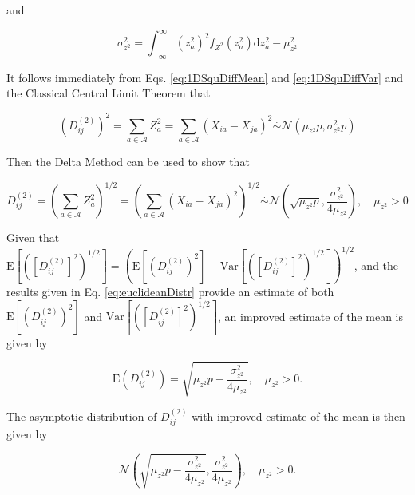 \documentclass[10pt,letterpaper]{article}\usepackage[]{graphicx}\usepackage[]{color}
\begin{document}
and

\begin{equation}\label{eq:1DSquDiffVar}
\sigma^2_{z^2} = \int_{-\infty}^{\infty} (z^2_a)^2 f_{Z^2}(z^2_a) \text{d}z^2_a - \mu^2_{z^2}
\end{equation}

It follows immediately from Eqs. \ref{eq:1DSquDiffMean} and \ref{eq:1DSquDiffVar} and the Classical Central Limit Theorem that

\begin{equation}\label{eq:SquDiffDistrGeneral}
\left(D^{(2)}_{ij}\right)^2 = \sum_{a \in \mathcal{A}} Z^2_a = \sum_{a \in \mathcal{A}} (X_{ia} - X_{ja})^2 \overset{.}{\sim} \mathcal{N}\left(\mu_{z^2}p,\sigma^2_{z^2}p\right)
\end{equation}

Then the Delta Method \cite{allStats} can be used to show that

\begin{equation}\label{eq:euclideanDistr}
D^{(2)}_{ij} = \left(\sum_{a \in \mathcal{A}} Z^2_a\right)^{1/2} = \left(\sum_{a \in \mathcal{A}} (X_{ia} - X_{ja})^2\right)^{1/2} \overset{.}{\sim} \mathcal{N}\left(\sqrt{\mu_{z^2}p},\frac{\sigma^2_{z^2}}{4\mu_{z^2}}\right), \quad \mu_{z^2} > 0
\end{equation}

Given that $\text{E}\left[\left(\left[D^{(2)}_{ij}\right]^2\right)^{1/2}\right] = \left(\text{E}\left[\left(D^{(2)}_{ij}\right)^2\right] - \text{Var}\left[\left(\left[D^{(2)}_{ij}\right]^2\right)^{1/2}\right]\right)^{1/2}$, and the results given in Eq. \ref{eq:euclideanDistr} provide an estimate of both $\text{E}\left[\left(D^{(2)}_{ij}\right)^2\right]$ and $\text{Var}\left[\left(\left[D^{(2)}_{ij}\right]^2\right)^{1/2}\right]$, an improved estimate of the mean is given by

\begin{equation}\label{eq:euclideanMean}
\text{E}\left(D^{(2)}_{ij}\right) = \sqrt{\mu_{z^2}p - \frac{\sigma^2_{z^2}}{4\mu_{z^2}}}, \quad \mu_{z^2} > 0.
\end{equation}

The asymptotic distribution of $D^{(2)}_{ij}$ with improved estimate of the mean is then given by

\begin{equation}
\mathcal{N}\left(\sqrt{\mu_{z^2}p - \frac{\sigma^2_{z^2}}{4\mu_{z^2}}},\frac{\sigma^2_{z^2}}{4\mu_{z^2}}\right), \quad \mu_{z^2} > 0.
\end{equation}
\end{document}
